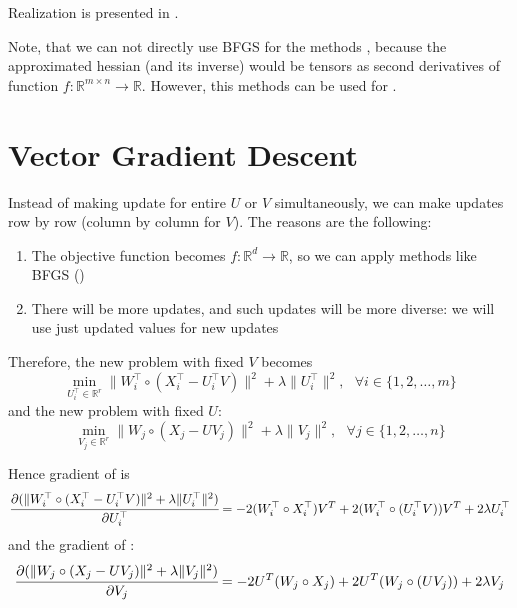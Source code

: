 \documentclass{article}
\def\R{\mathbb{R}}
\begin{document}
Realization is presented in .

Note, that we can not directly use BFGS for the methods , because the approximated hessian (and its inverse) would be tensors as second derivatives of function $f: \R^{m \times n} \rightarrow \R $. However, this methods can be used for .

\section{Vector Gradient Descent}\label{sec:vec}
Instead of making update for entire $U$ or $V$ simultaneously, we can make updates row by row (column by column for $V$). The reasons are the following:
\begin{enumerate}
  \item The objective function becomes $f: \R^d \rightarrow \R$, so we can apply methods like BFGS ()
  \item There will be more updates, and such updates will be more diverse: we will use just updated values for new updates
\end{enumerate}

Therefore, the new problem with fixed $V$ becomes
\begin{equation}\label{eq:vec_u}
  \min_{U^\top_i \in \R^r} \|W^\top_i \circ (X^\top_i - U^\top_i V)\|^2 + \lambda\|U^\top_i\|^2, \text{ }\forall i \in \{1,2,\ldots,m\}
\end{equation}
and the new problem with fixed $U$:
\begin{equation}\label{eq:vec_v}
  \min_{V_j \in \R^r} \|W_j \circ (X_j - UV_j)\|^2  + \lambda\|V_j\|^2, \text{ }\forall j \in \{1,2,\ldots,n\}
\end{equation}

Hence gradient of  is
\begin{equation}\label{eq:vec_grads_u}
  \cfrac{\partial (\|W^\top_i \circ (X^\top_i - U^\top_i V)\|^2 + \lambda\|U^\top_i\|^2)}{\partial U^\top_i} = -2 (W^\top_i \circ X^\top_i) V^T + 2 (W^\top_i \circ (U^\top_i V)) V^T + 2\lambda U^\top_i
\end{equation}
and the gradient of :
\begin{equation}\label{eq:vec_grads_v}
  \cfrac{\partial (\|W_j \circ (X_j - UV_j)\|^2  + \lambda\|V_j\|^2)}{\partial V_j} =  -2 U^T (W_j \circ X_j) + 2 U^T (W_j \circ (UV_j)) + 2\lambda V_j
\end{equation}
\end{document}
